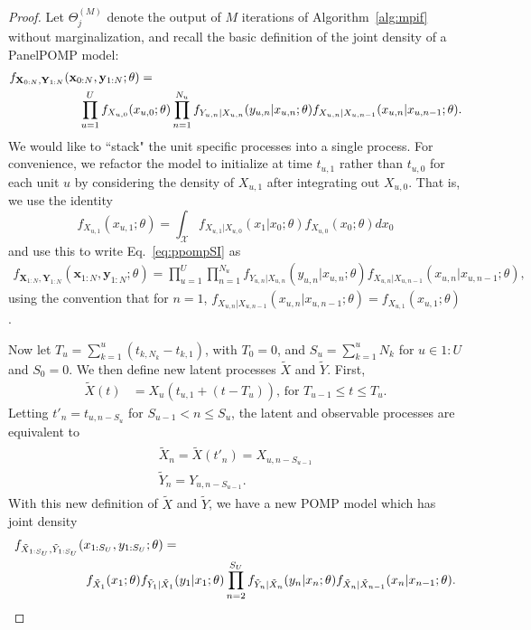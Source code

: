   \begin{proof} Let $\Theta_j^{(M)}$ denote the output of $M$ iterations of Algorithm~\ref{alg:mpif} without marginalization, and recall the basic definition of the joint density of a PanelPOMP model: 
  \begin{align}
&f_{\mathbf{X}_{0:N}, \mathbf{Y}_{1:N}}(\mathbf{x}_{0:N}, \mathbf{y}_{1:N}; \theta) =
\nonumber
\\
& \hspace{20mm} \prod_{u = 1}^Uf_{X_{u, 0}}(x_{u, 0};\theta) 
\prod_{n = 1}^{N_u}f_{Y_{u, n}|X_{u, n}}(y_{u, n} | x_{u, n} ;\theta)f_{X_{u, n} | X_{u, n-1}}(x_{u, n}|x_{u, n-1}; \theta). \label{eq:ppompSI}
\end{align}
  We would like to ``stack" the unit specific processes into a single process. 
  For convenience, we refactor the model to initialize at time $t_{u, 1}$ rather than $t_{u, 0}$ for each unit $u$ by considering the density of $X_{u, 1}$ after integrating out $X_{u, 0}$. 
  That is, we use the identity 
  $$
  f_{X_{u,1}}(x_{u, 1};\theta) = \int_{\mathcal{X}} f_{X_{u, 1}|X_{u, 0}}(x_1|x_0;\theta)f_{X_{u, 0}}(x_0;\theta)dx_0
  $$
  and use this to write Eq.~\ref{eq:ppompSI} as
  \begin{align}
  f_{\mathbf{X}_{1:N}, \mathbf{Y}_{1:N}}(\mathbf{x}_{1:N}, \mathbf{y}_{1:N}; \theta) = \prod_{u = 1}^U \prod_{n = 1}^{N_u}f_{Y_{u, n}|X_{u, n}}(y_{u, n} | x_{u, n} ;\theta)f_{X_{u, n} | X_{u, n-1}}(x_{u, n}|x_{u, n-1}; \theta), \label{eq:ppompSI1}
  \end{align}
  using the convention that for $n = 1$, $f_{X_{u, n} | X_{u, n-1}}(x_{u, n}|x_{u, n-1}; \theta) = f_{X_{u,1}}(x_{u, 1};\theta)$.
  
  Now let $T_u = \sum_{k = 1}^u (t_{k, N_k} - t_{k, 1})$, with $T_0 = 0$, and $S_u = \sum_{k = 1}^u N_k$ for $u \in 1:U$ and $S_0 = 0$. 
  We then define new latent processes $\tilde{X}$ and $\tilde{Y}$. First,
  \begin{align}
    \tilde{X}(t) &= X_u(t_{u, 1} + (t - T_u)), \, \text{for} \,\, T_{u-1} \leq t \leq T_u.
  \end{align}
  Letting $t'_n = t_{u, n-S_u}$ for $S_{u - 1} < n \leq S_u$, the latent and observable processes are equivalent to
  \begin{align*}
  \begin{split}
    \tilde{X}_n = \tilde{X}(t'_n) = X_{u, n - S_{u - 1}} \\
    \tilde{Y}_n = Y_{u, n - S_{u-1}}. 
  \end{split}
  \end{align*}
  With this new definition of $\tilde{X}$ and $\tilde{Y}$, we have a new POMP model which has joint density
  \begin{align}
&f_{\tilde{X}_{1:S_U}, \tilde{Y}_{1:S_U}}(x_{1:S_U}, y_{1:S_U}; \theta) =  \nonumber
\\
& \hspace{20mm}
f_{\tilde{X}_1}(x_1;\theta)f_{\tilde{Y}_1|\tilde{X}_1}(y_1 | x_1; \theta)\prod_{n = 2}^{S_{U}}f_{\tilde{Y}_n|\tilde{X}_n}(y_n | x_n; \theta)f_{\tilde{X}_{n}|\tilde{X}_{n - 1}}(x_n | x_{n - 1}; \theta). \label{eq:lowPOMP}
  \end{align}


\end{proof}
